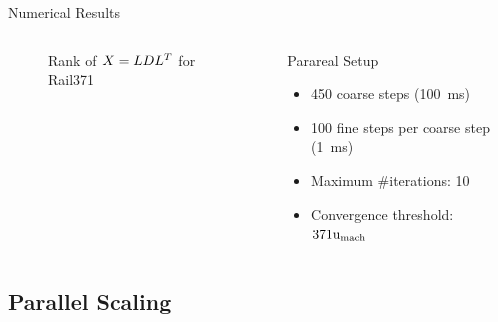 \begin{frame}{Numerical Results}
\begin{columns}
\begin{minipage}[b][0.75\textwidth][c]{\textwidth}
{\begin{figure}
  \caption{Rank of $X=LDL^T$ for Rail371}
  \end{figure}
}
  \end{minipage}
  \begin{block}{Parareal Setup}
    \begin{itemize}
      \item
        450 coarse steps (\SI{100}{\milli\second})
      \item
        100 fine steps per coarse step (\SI{1}{\milli\second})
      \item
        Maximum \#iterations: 10
      \item
        Convergence threshold: $371\mathrm u_\text{mach}$
    \end{itemize}
  \end{block}
  \end{columns}
\end{frame}

\subsection{Parallel Scaling}


